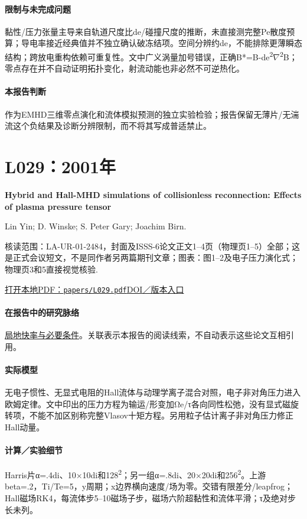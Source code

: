 \documentclass[UTF8,a4paper,11pt,openany,fontset=fandol]{ctexbook}
\begin{document}
\paragraph{限制与未完成问题}黏性/压力张量主导来自轨道尺度比de/碰撞尺度的推断，未直接测完整Pe散度预算；导电率接近经典值并不独立确认破冻结项。空间分辨约de，不能排除更薄瞬态结构；跨放电重构依赖可重复性。文中广义涡量加号错误，正确B*=B-de\textsuperscript{2}\ensuremath{\nabla}\textsuperscript{2}B；零点存在并不自动证明拓扑变化，射流动能也非必然不可逆热化。

\paragraph{本报告判断}作为EMHD三维零点演化和流体模拟预测的独立实验检验；报告保留无薄片/无湍流这个负结果及诊断分辨限制，而不将其写成普适禁止。

\section{L029：2001年}\label{paper:L029}

\textbf{Hybrid and Hall-MHD simulations of collisionless reconnection: Effects of plasma pressure tensor}\citep{L029}\

Lin Yin;  D. Winske;  S. Peter Gary;  Joachim Birn.

\textsf{核读范围：}LA-UR-01-2484，封面及ISSS-6论文正文1–4页（物理页1–5）全部；这是正式会议短文，不是同作者另两篇期刊文章；\textsf{图表：}图1–2及电子压力演化式；物理页3和5直接视觉核验.

\href{run:../papers/L029.pdf}{打开本地PDF：\texttt{papers/L029.pdf}}\quad\href{https://digital.library.unt.edu/ark:/67531/metadc718188/}{DOI／版本入口}

\paragraph{在报告中的研究脉络}\hyperref[story:fast]{局地快率与必要条件}。关联表示本报告的阅读线索，不自动表示这些论文互相引用。

\paragraph{实际模型}无电子惯性、无显式电阻的Hall流体与动理学离子混合对照，电子非对角压力进入欧姆定律。文中印出的压力方程为输运/形变加Ωe/τ各向同性松弛，没有显式磁旋转项，不能不加区别称完整Vlasov十矩方程。另用粒子估计离子非对角压力修正Hall动量。

\paragraph{计算／实验细节}Harris片α=.4di、10×10di和128\textsuperscript{2}；另一组α=.8di、20×20di和256\textsuperscript{2}。上游beta=.2，Ti/Te=5，y周期；x边界横向速度/场为零。交错有限差分/leapfrog；Hall磁场RK4，每流体步5–10磁场子步，磁场六阶超黏性和流体平滑；τ及绝对步长未列。
\end{document}
